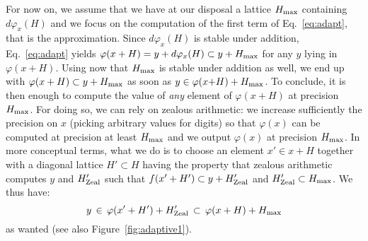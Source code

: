 \documentclass[11pt]{article}
\numberwithin{equation}{section}
\numberwithin{figure}{section}
\theoremstyle{definition}
\renewcommand{\max}{\text{\rm max}}
\newcommand{\zealous}{\text{\rm Zeal}}
\begin{document}
For now on, we assume that we have at our disposal a lattice $H_\max$ 
containing $d \varphi_x(H)$ and we focus on the computation of the first 
term of Eq.~\eqref{eq:adapt}, that is the approximation.
Since $d \varphi_x(H)$ is stable under addition, 
Eq.~\eqref{eq:adapt} yields $\varphi(x+H) = y + d\varphi_x(H) 
\subset y + H_\max$ for any $y$ lying in $\varphi(x{+}H)$. Using now
that $H_\max$ is stable under addition as well, we end up with 
$\varphi(x+H) \subset y + H_\max$ as soon as $y \in \varphi(x{+}H) + 
H_\max$.
To conclude, it is then enough to 
compute the value of \emph{any} element of $\varphi(x{+}H)$ at precision 
$H_\max$. For doing so, we can rely on zealous arithmetic: we increase 
sufficiently the precision on $x$ (picking arbitrary values for digits) 
so that $\varphi(x)$ can be computed at precision at least $H_\max$ and 
we output $\varphi(x)$ at precision $H_\max$. 
In more conceptual terms, what we do is to choose an element $x' \in 
x{+}H$ together with a diagonal lattice $H' \subset H$ having the 
property that zealous arithmetic computes $y$ and $H'_\zealous$ 
such that $f(x'+H') \subset y + H'_\zealous$ and 
$H'_\zealous \subset H_\max$. We thus have:
$$y \, \in \, \varphi(x'+H') + H'_\zealous 
\, \subset \, \varphi(x+H) + H_\max$$
as wanted (see also Figure~\ref{fig:adaptive1}).
%
\end{document}
